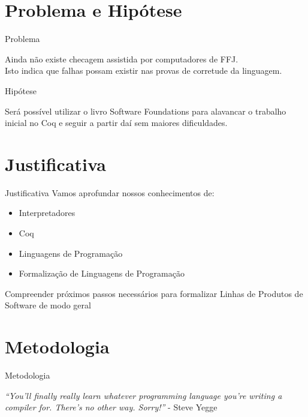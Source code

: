 \documentclass{beamer}
\begin{document}
	
	\section{Problema e Hipótese}
	\begin{frame}{Problema}
		\begin{block}{}
			Ainda não existe checagem assistida por computadores de FFJ. \\
			Isto indica que falhas possam existir nas provas de corretude da linguagem.
		\end{block}
	\end{frame}
	
	
	\begin{frame}{Hipótese}
		\begin{block}{}
			Será possível utilizar o livro Software Foundations para alavancar o trabalho inicial no Coq e seguir a partir daí sem maiores dificuldades.
		\end{block}
	\end{frame}
			
	\section{Justificativa}
	
	
	\begin{frame}{Justificativa}
		Vamos aprofundar nossos conhecimentos de:
		\begin{itemize}
			\item Interpretadores
			\item Coq
			\item Linguagens de Programação
			\item Formalização de Linguagens de Programação
		\end{itemize}    
		\begin{block}{}
			Compreender próximos passos necessários para formalizar Linhas de Produtos de Software de modo geral
		\end{block}
	\end{frame}

	
	\section{Metodologia}
	\begin{frame}{Metodologia}
		\centering
		\begin{block}{}
		\textit{``You'll finally really learn whatever programming language you're writing a compiler for. There's no other way. Sorry!''} -  Steve Yegge
	\end{block}
	\end{frame}
	
\end{document}
